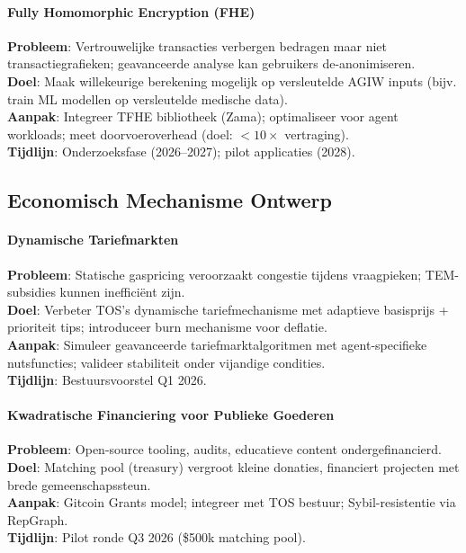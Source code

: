 \documentclass[11pt]{article}
\begin{document}
\paragraph{Fully Homomorphic Encryption (FHE)}
\textbf{Probleem}: Vertrouwelijke transacties verbergen bedragen maar niet transactiegrafieken; geavanceerde analyse kan gebruikers de-anonimiseren.\\
\textbf{Doel}: Maak willekeurige berekening mogelijk op versleutelde AGIW inputs (bijv. train ML modellen op versleutelde medische data).\\
\textbf{Aanpak}: Integreer TFHE bibliotheek (Zama); optimaliseer voor agent workloads; meet doorvoeroverhead (doel: $<10\times$ vertraging).\\
\textbf{Tijdlijn}: Onderzoeksfase (2026--2027); pilot applicaties (2028).

\subsection{Economisch Mechanisme Ontwerp}

\paragraph{Dynamische Tariefmarkten}
\textbf{Probleem}: Statische gaspricing veroorzaakt congestie tijdens vraagpieken; TEM-subsidies kunnen inefficiënt zijn.\\
\textbf{Doel}: Verbeter TOS's dynamische tariefmechanisme met adaptieve basisprijs + prioriteit tips; introduceer burn mechanisme voor deflatie.\\
\textbf{Aanpak}: Simuleer geavanceerde tariefmarktalgoritmen met agent-specifieke nutsfuncties; valideer stabiliteit onder vijandige condities.\\
\textbf{Tijdlijn}: Bestuursvoorstel Q1 2026.

\paragraph{Kwadratische Financiering voor Publieke Goederen}
\textbf{Probleem}: Open-source tooling, audits, educatieve content ondergefinancierd.\\
\textbf{Doel}: Matching pool (treasury) vergroot kleine donaties, financiert projecten met brede gemeenschapssteun.\\
\textbf{Aanpak}: Gitcoin Grants model; integreer met TOS bestuur; Sybil-resistentie via RepGraph.\\
\textbf{Tijdlijn}: Pilot ronde Q3 2026 (\$500k matching pool).
\end{document}

